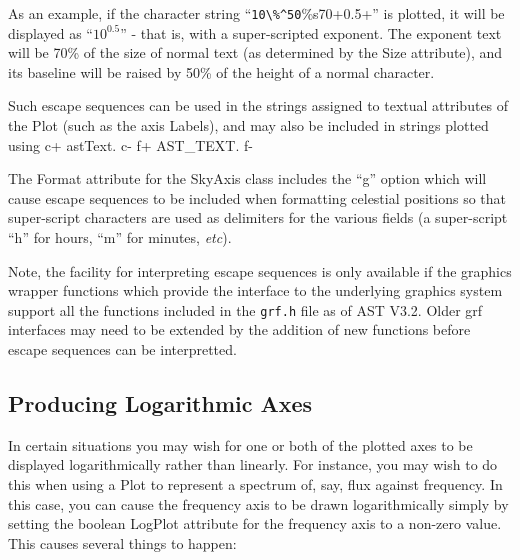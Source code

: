 \documentclass[twoside,11pt]{article}
\begin{document}
As an example, if the character string ``\verb+10\%^50+\%s70+0.5+'' is
plotted, it will be displayed as ``$10^{0.5}$'' - that is, with a
super-scripted exponent. The exponent text will be 70\% of the size of
normal text (as determined by the Size attribute), and its baseline will
be raised by 50\% of the height of a normal character.

Such escape sequences can be used in the strings assigned to textual
attributes of the Plot (such as the axis Labels), and may also be
included in strings plotted using 
c+
astText.
c-
f+
AST\_TEXT.
f-

The Format attribute for the SkyAxis class includes the ``g'' option
which will cause escape sequences to be included when formatting
celestial positions so that super-script characters are used as
delimiters for the various fields (a super-script ``h'' for hours, ``m''
for minutes, \emph{etc}).

Note, the facility for interpreting escape sequences is only available if
the graphics wrapper functions which provide the interface to the
underlying graphics system support all the functions included in the
\verb+grf.h+ file as of AST V3.2. Older grf interfaces may need to be
extended by the addition of new functions before escape sequences can be
interpretted.

\subsection{\label{ss:logaxes}Producing Logarithmic Axes}
In certain situations you may wish for one or both of the plotted axes to
be displayed logarithmically rather than linearly. For instance, you may
wish to do this when using a Plot to represent a spectrum of, say, flux
against frequency. In this case, you can cause the frequency axis to be drawn
logarithmically simply by setting the boolean LogPlot attribute for the
frequency axis to a non-zero value. This causes several things to happen:
\end{document}
